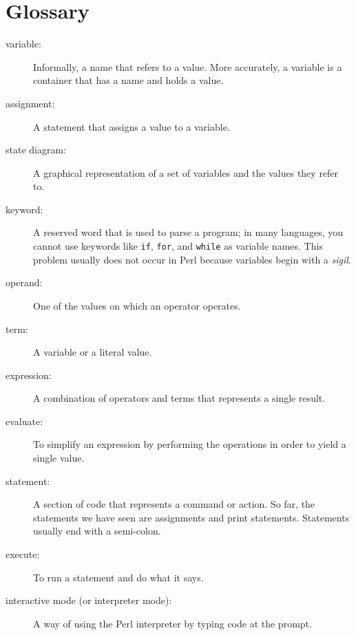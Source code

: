 \section{Glossary}

\begin{description}

\item[variable:]  Informally, a name that refers to a value. More 
accurately, a variable is a container that has a name and holds a value.

\item[assignment:]  A statement that assigns a value to a variable.

\item[state diagram:]  A graphical representation of a set of variables and the
values they refer to.

\item[keyword:]  A reserved word that is used to parse a
program; in many languages, you cannot use keywords like {\tt if}, {\tt  for},
and {\tt while} as variable names. This problem usually does not occur in 
Perl because variables begin with a \emph{sigil}.

\item[operand:]  One of the values on which an operator operates.

\item[term:]  A variable or a literal value.

\item[expression:]  A combination of operators and terms that
represents a single result.

\item[evaluate:]  To simplify an expression by performing the operations
in order to yield a single value.

\item[statement:]  A section of code that represents a command or action.  So
far, the statements we have seen are assignments and print statements. Statements usually end with a semi-colon.

\item[execute:]  To run a statement and do what it says.

\item[interactive mode (or interpreter mode):] A way of using the Perl 
interpreter by typing code at the prompt.


\end{description}
